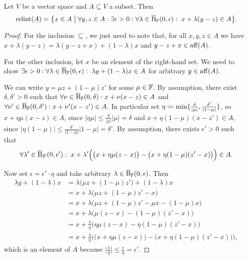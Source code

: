 \begin{lemma} \label{relativeInteriorEquivalent}
Let $V$ be a vector space and $A\subseteq V$ a subset. Then
\[ \relint(A) = \setbuilder{x\in A}{\forall y,z\in A: \exists \epsilon >0: \forall \lambda \in \cball_\F(0,\epsilon):\; x + \lambda (y-z) \in A}. \]
\end{lemma}
\begin{proof}
For the inclusion $\subseteq$, we just need to note that, for all $x,y,z\in A$ we have $x + \lambda (y-z) = \lambda (y-z+x) + (1-\lambda)x$ and $y-z+x\in \operatorname{aff}(A)$.

For the other inclusion, let $x$ be an element of the right-hand set. We need to show $\exists \epsilon >0: \forall \lambda \in \operatorname{\overline{B}}_{\mathbb{F}}(0,\epsilon):\; \lambda y + (1-\lambda) x \in A$ for arbitrary $y\in \operatorname{aff}(A)$.

We can write $y = \mu z + (1-\mu) z'$ for some $\mu\in \mathbb{F}$. By assumption, there exist $\delta, \delta'>0$ such that $\forall \nu\in \operatorname{\overline{B}}_{\mathbb{F}}(0,\delta): x+ \nu(x-z)\in A$ and $\forall \nu'\in \operatorname{\overline{B}}_{\mathbb{F}}(0,\delta'): x+ \nu'(x-z')\in A$. In particular set $\eta \coloneqq \min\{\frac{\delta}{|\mu|}, \frac{\delta'}{|1-\mu|}\}$, so $x+ \eta \mu(x-z)\in A$, since $|\eta\mu| \leq \frac{\delta}{|\mu|}|\mu| = \delta$ and $x+ \eta (1-\mu)(x-z')\in A$, since $|\eta(1-\mu)| \leq \frac{\delta'}{|1-\mu|}|1-\mu| = \delta'$.
By assumption, there exists $\epsilon'> 0$ such that
\[ \forall \lambda'\in\operatorname{\overline{B}}_F(0,\epsilon'):\; x + \lambda'\Big(\big(x + \eta\mu(z-x)\big) - \big(x + \eta(1-\mu)(z'- x)\big)\Big)\in A. \]

Now set $\epsilon = \epsilon'\cdot \eta$ and take arbitrary $\lambda\in \operatorname{\overline{B}}_{\mathbb{F}}(0,\epsilon)$. Then
\begin{align*}
\lambda y + (1-\lambda) x &= \lambda\big(\mu z + (1-\mu) z'\big) + (1-\lambda)x \\
&= x + \lambda\big(\mu z + (1-\mu) z' - x\big) \\
&= x + \lambda\big(\mu z + (1-\mu) z' - \mu x - (1-\mu)x\big) \\
&= x + \lambda\big(\mu(z-x) - (1-\mu)(z'- x)\big) \\
&= x + \frac{\lambda}{\eta}\big(\eta\mu(z-x) - \eta(1-\mu)(z'- x)\big) \\
&= x + \frac{\lambda}{\eta}\Big(\big(x + \eta\mu(z-x)\big) - \big(x + \eta(1-\mu)(z'- x)\big)\Big),
\end{align*}
which is an element of $A$ because $\big|\frac{\lambda}{\eta}\big| \leq \frac{\epsilon}{\eta} = \epsilon'$.
\end{proof}

